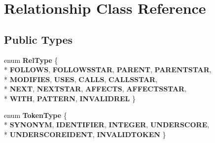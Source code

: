 \hypertarget{class_relationship}{\section{Relationship Class Reference}
\label{class_relationship}
}
\subsection*{Public Types}
\begin{DoxyCompactItemize}
\item 
\hypertarget{class_relationship_ad3f427dbfeb8a7868c56ff1824d4d5e7}{enum {\bfseries Rel\+Type} \{ \\*
{\bfseries F\+O\+L\+L\+O\+W\+S}, 
{\bfseries F\+O\+L\+L\+O\+W\+S\+S\+T\+A\+R}, 
{\bfseries P\+A\+R\+E\+N\+T}, 
{\bfseries P\+A\+R\+E\+N\+T\+S\+T\+A\+R}, 
\\*
{\bfseries M\+O\+D\+I\+F\+I\+E\+S}, 
{\bfseries U\+S\+E\+S}, 
{\bfseries C\+A\+L\+L\+S}, 
{\bfseries C\+A\+L\+L\+S\+S\+T\+A\+R}, 
\\*
{\bfseries N\+E\+X\+T}, 
{\bfseries N\+E\+X\+T\+S\+T\+A\+R}, 
{\bfseries A\+F\+F\+E\+C\+T\+S}, 
{\bfseries A\+F\+F\+E\+C\+T\+S\+S\+T\+A\+R}, 
\\*
{\bfseries W\+I\+T\+H}, 
{\bfseries P\+A\+T\+T\+E\+R\+N}, 
{\bfseries I\+N\+V\+A\+L\+I\+D\+R\+E\+L}
 \}}\label{class_relationship_ad3f427dbfeb8a7868c56ff1824d4d5e7}

\item 
\hypertarget{class_relationship_a731fd5ecd262b26a0232dff03223506c}{enum {\bfseries Token\+Type} \{ \\*
{\bfseries S\+Y\+N\+O\+N\+Y\+M}, 
{\bfseries I\+D\+E\+N\+T\+I\+F\+I\+E\+R}, 
{\bfseries I\+N\+T\+E\+G\+E\+R}, 
{\bfseries U\+N\+D\+E\+R\+S\+C\+O\+R\+E}, 
\\*
{\bfseries U\+N\+D\+E\+R\+S\+C\+O\+R\+E\+I\+D\+E\+N\+T}, 
{\bfseries I\+N\+V\+A\+L\+I\+D\+T\+O\+K\+E\+N}
 \}}\label{class_relationship_a731fd5ecd262b26a0232dff03223506c}

\end{DoxyCompactItemize}
